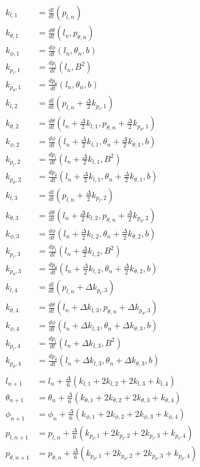 \documentclass{article}
\begin{document}
\begin{align*}
k_{l,1} &= \frac{d l}{d t}(p_{l,n})\\
k_{\theta,1} &= \frac{d \theta}{d t}(l_{n},p_{\theta,n})\\
k_{\phi,1} &= \frac{d \phi}{d t}(l_{n},\theta_{n},b)\\
k_{p_{l},1} &= \frac{d p_{l}}{d t}(l_{n}, B^{2})\\
k_{p_{\theta},1} &= \frac{d p_{\theta}}{d t}(l_{n}, \theta_{n}, b)\\
k_{l,2} &= \frac{d l}{d t}(p_{l,n}+\frac{\Delta}{2} k_{p_{l},1})\\
k_{\theta,2} &= \frac{d \theta}{d t}(l_{n}+\frac{\Delta}{2} k_{l,1},p_{\theta,n}+\frac{\Delta}{2} k_{p_{\theta},1})\\
k_{\phi,2} &= \frac{d \phi}{d t}(l_{n}+\frac{\Delta}{2} k_{l,1},\theta_n+\frac{\Delta}{2} k_{\theta,1},b)\\
k_{p_{l},2} &= \frac{d p_{l}}{d t}(l_{n}+\frac{\Delta}{2} k_{l,1}, B^{2})\\
k_{p_{\theta},2} &= \frac{d p_{\theta}}{d t}(l_{n}+\frac{\Delta}{2} k_{l,1}, \theta_{n} +\frac{\Delta}{2} k_{\theta,1}, b)\\
k_{l,3} &= \frac{d l}{d t}(p_{l,n}+\frac{\Delta}{2} k_{p_{l},2})\\
k_{\theta,3} &= \frac{d \theta}{d t}(l_{n}+\frac{\Delta}{2} k_{l,2},p_{\theta,n}+\frac{\Delta}{2} k_{p_{\theta},2})\\
k_{\phi,3} &= \frac{d \phi}{d t}(l_{n}+\frac{\Delta}{2} k_{l,2},\theta_{n}+\frac{\Delta}{2} k_{\theta,2},b)\\
k_{p_{l},3} &= \frac{d p_{l}}{d t}(l_{n}+\frac{\Delta}{2} k_{l,2}, B^{2})\\
k_{p_{\theta},3} &= \frac{d p_{\theta}}{d t}(l_{n}+\frac{\Delta}{2} k_{l,2}, \theta_{n} +\frac{\Delta}{2} k_{\theta,2}, b)\\
k_{l,4} &= \frac{d l}{d t}(p_{l,n}+\Delta k_{p_{l},3})\\
k_{\theta,4} &= \frac{d \theta}{d t}(l_{n}+\Delta k_{l,3},p_{\theta,n}+\Delta k_{p_{\theta},3})\\
k_{\phi,4} &= \frac{d \phi}{d t}(l_{n}+\Delta k_{l,3},\theta_{n}+\Delta k_{\theta,3},b)\\
k_{p_{l},4} &= \frac{d p_{l}}{d t}(l_{n}+\Delta k_{l,3}, B^{2})\\
k_{p_{\theta},4} &= \frac{d p_{\theta}}{d t}(l_{n}+\Delta k_{l,3}, \theta_{n} +\Delta k_{\theta,3}, b)\\
\\
l_{n+1}&=l_{n}+\frac{\Delta}{6} (k_{l,1}+2k_{l,2}+2k_{l,3}+k_{l,4})\\
\theta_{n+1}&=\theta_{n}+\frac{\Delta}{6} (k_{\theta,1}+2k_{\theta,2}+2k_{\theta,3}+k_{\theta,4})\\
\phi_{n+1}&=\phi_{n}+\frac{\Delta}{6} (k_{\phi,1}+2k_{\phi,2}+2k_{\phi,3}+k_{\phi,4})\\
p_{l,n+1}&=p_{l,n}+\frac{\Delta}{6} (k_{p_{l},1}+2k_{p_{l},2}+2k_{p_{l},3}+k_{p_{l},4})\\
p_{\theta,n+1}&=p_{\theta,n}+\frac{\Delta}{6} (k_{p_{\theta},1}+2k_{p_{\theta},2}+2k_{p_{\theta},3}+k_{p_{\theta},4})\\
\end{align*}
\end{document}
